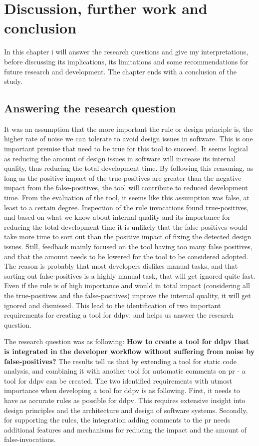 \documentclass{report}
\begin{document}
\chapter{Discussion, further work and conclusion}
\label{discussion}
In this chapter i will answer the research questions and give my interpretations, before discussing its implications, its limitations and some recommendations for future research and development. The chapter ends with a conclusion of the study.

\section{Answering the research question}

It was an assumption that the more important the rule or design principle is, the higher rate of noise we can tolerate to avoid design issues in software. This is one important premise that need to be true for this tool to succeed. It seems logical as reducing the amount of design issues in software will increase its internal quality, thus reducing the total development time. By following this reasoning, as long as the positive impact of the true-positives are greater than the negative impact from the false-positives, the tool will contribute to reduced development time. From the evaluation of the tool, it seems like this assumption was false, at least to a certain degree. Inspection of the rule invocations found true-positives, and based on what we know about internal quality and its importance for reducing the total development time it is unlikely that the false-positives would take more time to sort out than the positive impact of fixing the detected design issues. Still, feedback mainly focused on the tool having too many false positives, and that the amount needs to be lowered for the tool to be considered adopted. The reason is probably that most developers dislikes manual tasks, and that sorting out false-positives is a highly manual task, that will get ignored quite fast. Even if the rule is of high importance and would in total impact (considering all the true-positives and the false-positives) improve the internal quality, it will get ignored and dismissed. This lead to the identification of two important requirements for creating a tool for \gls{ddpv}, and helps us answer the research question. 

The research question was as following: \textbf{How to create a tool for \gls{ddpv} that is integrated in the developer workflow without suffering from noise by false-positives?}
The results tell us that by extending a tool for static code analysis, and combining it with another tool for automatic comments on \gls{pr} - a tool for \gls{ddpv} can be created. The two identified requirements with utmost importance when developing a tool for \gls{ddpv} is as following. First, it needs to have as accurate rules as possible for \gls{ddpv}. This requires extensive insight into design principles and the architecture and design of software systems. Secondly, for supporting the rules, the integration adding comments to the \gls{pr} needs additional features and mechanisms for reducing the impact and the amount of false-invocations. 
\end{document}
